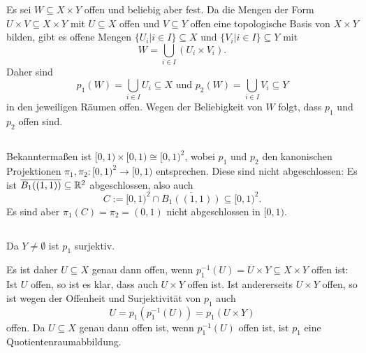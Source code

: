 \documentclass[a4paper,10pt]{article}
\begin{document}
\section{}


\subsection{}
Es sei $W \subseteq X \times Y$ offen und beliebig aber fest. Da die Mengen der Form $U \times V \subseteq X \times Y$ mit $U \subseteq X$ offen und $V \subseteq Y$ offen eine topologische Basis von $X \times Y$ bilden, gibt es offene Mengen  $\{U_i | i \in I\} \subseteq X$ und $\{V_i | i \in I\} \subseteq Y$ mit
\[
 W = \bigcup_{i \in I} (U_i \times V_i).
\]
Daher sind
\[
 p_1(W) = \bigcup_{i \in I} U_i \subseteq X \text{ und } p_2(W) = \bigcup_{i \in I} V_i \subseteq Y
\]
in den jeweiligen Räumen offen. Wegen der Beliebigkeit von $W$ folgt, dass $p_1$ und $p_2$ offen sind.


\subsection{}
Bekanntermaßen ist $[0,1) \times [0,1) \cong [0,1)^2$, wobei $p_1$ und $p_2$ den kanonischen Projektionen $\pi_1, \pi_2 : [0,1)^2 \to [0,1)$ entsprechen. Diese sind nicht abgeschlossen: Es ist $\overline{B_1((1,1))} \subseteq \mathbb{R}^2$ abgeschlossen, also auch
\[
 C := [0,1)^2 \cap \overline{B_1((1,1))} \subseteq [0,1)^2.
\]
Es sind aber $\pi_1(C) = \pi_2 = (0,1)$ nicht abgeschlossen in $[0,1)$.


\subsection{}
Da $Y \neq \emptyset$ ist $p_1$ surjektiv.

Es ist daher $U \subseteq X$ genau dann offen, wenn $p_1^{-1}(U) = U \times Y \subseteq X \times Y$ offen ist: Ist $U$ offen, so ist es klar, dass auch $U \times Y$ offen ist. Ist andererseits $U \times Y$ offen, so ist wegen der Offenheit und Surjektivität von $p_1$ auch
\[
 U = p_1(p_1^{-1}(U)) = p_1(U \times Y)
\]
offen.
Da $U \subseteq X$ genau dann offen ist, wenn $p_1^{-1}(U)$ offen ist, ist $p_1$ eine Quotientenraumabbildung.





\section{}
\end{document}
